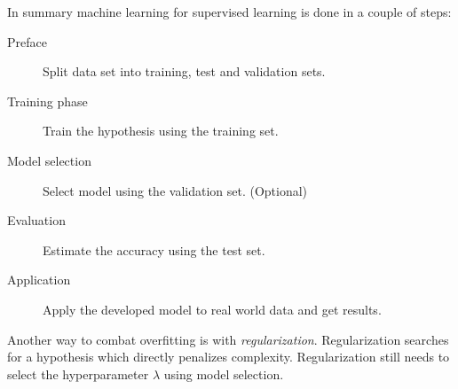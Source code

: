 In summary machine learning for supervised learning is done in a couple of steps:

\begin{description}
    \item[Preface] Split data set into training, test and validation sets.
    \item[Training phase] Train the hypothesis using the training set.
    \item[Model selection] Select model using the validation set. (Optional)
    \item[Evaluation] Estimate the accuracy using the test set.
    \item[Application] Apply the developed model to real world data and get results.
\end{description}

Another way to combat overfitting is with \textit{regularization}. Regularization searches for a hypothesis which directly penalizes complexity.  Regularization still needs to select the hyperparameter $\lambda$ using model selection.
\citep{norvigAI}
